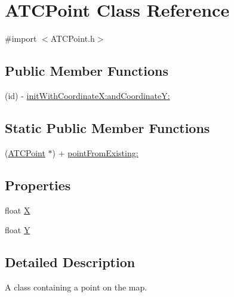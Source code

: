 \hypertarget{interface_a_t_c_point}{
\section{\-A\-T\-C\-Point \-Class \-Reference}
\label{interface_a_t_c_point}
}


{\ttfamily \#import $<$\-A\-T\-C\-Point.\-h$>$}

\subsection*{\-Public \-Member \-Functions}
\begin{DoxyCompactItemize}
\item 
(id) -\/ \hyperlink{interface_a_t_c_point_ac3d2d01f7bc956af4760bc9ecdf09b8c}{init\-With\-Coordinate\-X\-:and\-Coordinate\-Y\-:}
\end{DoxyCompactItemize}
\subsection*{\-Static \-Public \-Member \-Functions}
\begin{DoxyCompactItemize}
\item 
(\hyperlink{interface_a_t_c_point}{\-A\-T\-C\-Point} $\ast$) + \hyperlink{interface_a_t_c_point_a1d38b4d3278cc6e4652ca2e65e19de56}{point\-From\-Existing\-:}
\end{DoxyCompactItemize}
\subsection*{\-Properties}
\begin{DoxyCompactItemize}
\item 
float \hyperlink{interface_a_t_c_point_a8ead9bbb9589229db82c8fe997662eca}{\-X}
\item 
float \hyperlink{interface_a_t_c_point_a65758c3125ed16ddce2a3d1607cf70d2}{\-Y}
\end{DoxyCompactItemize}


\subsection{\-Detailed \-Description}
\-A class containing a point on the map. 

